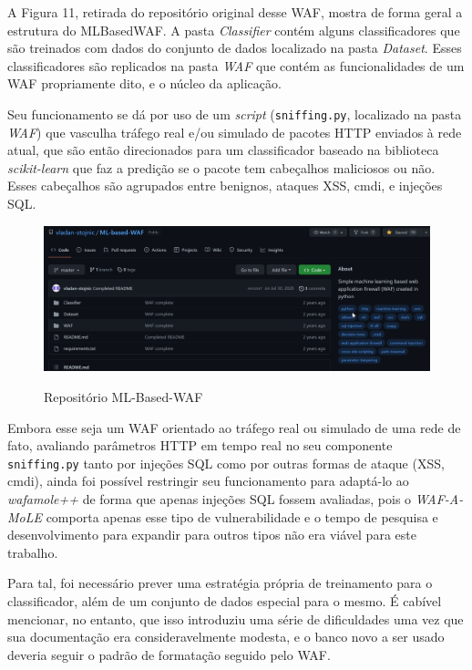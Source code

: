 A Figura 11, retirada do repositório original desse WAF, mostra de forma geral a estrutura do MLBasedWAF. A pasta \textit{Classifier} contém alguns classificadores que são treinados com dados do conjunto de dados localizado na pasta \textit{Dataset}. Esses classificadores são replicados na pasta \textit{WAF} que contém as funcionalidades de um WAF propriamente dito, e o núcleo da aplicação.

Seu funcionamento se dá por uso de um \textit{script} (\verb+sniffing.py+, localizado na pasta \textit{WAF}) que vasculha tráfego real e/ou simulado de pacotes HTTP enviados à rede atual, que são então direcionados para um classificador baseado na biblioteca \textit{scikit-learn} que faz a predição se o pacote tem cabeçalhos maliciosos ou não. Esses cabeçalhos são agrupados entre benignos, ataques XSS, cmdi, e injeções SQL.

\begin{figure}[ht]
    \centering
    \caption{Repositório ML-Based-WAF}
    \includegraphics[width=16cm]{figuras/MLBasedWAF.png} 
    \label{fig:internet} 
\end{figure}

Embora esse seja um WAF orientado ao tráfego real ou simulado de uma rede de fato, avaliando parâmetros HTTP em tempo real no seu componente \verb+sniffing.py+ tanto por injeções SQL como por outras formas de ataque (XSS, cmdi), ainda foi possível restringir seu funcionamento para adaptá-lo ao \textit{wafamole++} de forma que apenas injeções SQL fossem avaliadas, pois o \textit{WAF-A-MoLE} comporta apenas esse tipo de vulnerabilidade e o tempo de pesquisa e desenvolvimento para expandir para outros tipos não era viável para este trabalho.

Para tal, foi necessário prever uma estratégia própria de treinamento para o classificador, além de um conjunto de dados especial para o mesmo. É cabível mencionar, no entanto, que isso introduziu uma série de dificuldades uma vez que sua documentação era consideravelmente modesta, e o banco novo a ser usado deveria seguir o padrão de formatação seguido pelo WAF.

